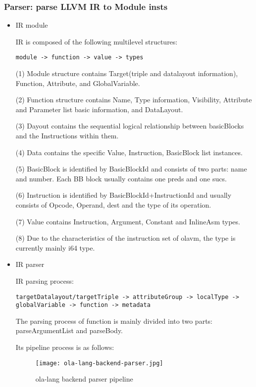 \subsubsection{Parser: parse LLVM IR to Module insts}

    \begin{itemize}
        \item IR module

IR is composed of the following multilevel structures:
\begin{lstlisting}[language={}]
module -> function -> value -> types
\end{lstlisting}

(1) Module structure contains Target(triple and datalayout information), Function, Attribute, and GlobalVariable.

(2) Function structure contains Name, Type information, Visibility, Attribute and Parameter list basic information, and DataLayout.

(3) Dayout contains the sequential logical relationship between basicBlocks and the Instructions within them.

(4) Data contains the specific Value, Instruction, BasicBlock list instances.

(5) BasicBlock is identified by BasicBlockId and consists of two parts: name and number. Each BB block usually contains one preds and one sucs.

(6) Instruction is identified by BasicBlockId+InstructionId and usually consists of Opcode, Operand, dest and the type of its operation.

(7) Value contains Instruction, Argument, Constant and InlineAsm types.

(8) Due to the characteristics of the instruction set of olavm, the type is currently mainly i64 type.

        \item IR parser

IR parsing process:
\begin{lstlisting}[language={}]
targetDatalayout/targetTriple -> attributeGroup -> localType ->
globalVariable -> function -> metadata
\end{lstlisting}

The parsing process of function is mainly divided into two parts: parseArgumentList and parseBody.

Its pipeline process is as follows:
\begin{figure}[!htbp]
    \centering
    \texttt{[image: ola-lang-backend-parser.jpg]}
    \caption{ola-lang backend parser pipeline}
    \label{fig:ola-lang-backend-parser}
\end{figure}
\end{itemize}
